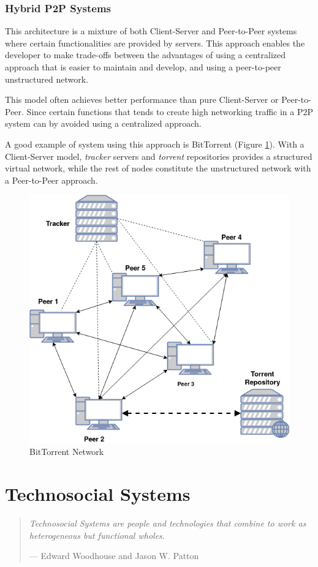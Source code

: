 \subsubsection*{Hybrid P2P Systems}
This architecture is a mixture of both Client-Server and Peer-to-Peer systems where certain functionalities are provided by servers. This approach enables the developer to make trade-offs between the advantages of using a centralized approach that is easier to maintain and develop, and using a peer-to-peer unstructured network.

This model often achieves better performance than pure Client-Server or Peer-to-Peer. Since certain functions that tends to create high networking traffic in a P2P system can by avoided using a centralized approach.

A good example of system using this approach is BitTorrent\cite{bittorrent} (Figure \ref{fig:bittorrent}). With a Client-Server model, \textit{tracker} servers and \textit{torrent} repositories provides a structured virtual network, while the rest of nodes constitute the unstructured network with a Peer-to-Peer approach.

\begin{figure}[h!]
    \centering
    \includegraphics[width=0.5\linewidth]{assets/images/bittorrent.png}
    \caption{BitTorrent Network}
    \label{fig:bittorrent}
\end{figure}  


\section{Technosocial Systems}
\begin{quote}
\textit{Technosocial Systems are people and technologies that combine to work as heterogeneous but functional wholes.}
    \begin{flushright}
        \tiny{--- Edward Woodhouse and Jason W. Patton \cite{technosocial}}
    \end{flushright}
\end{quote}

